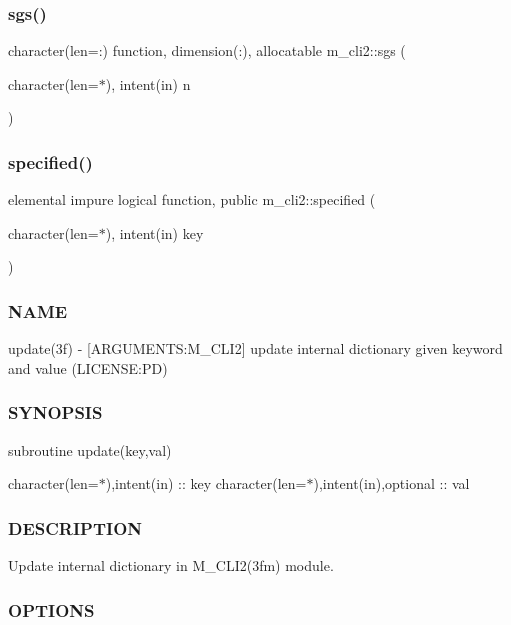 \subsubsection{\texorpdfstring{sgs()}{sgs()}}
{\footnotesize\ttfamily character(len=\+:) function, dimension(\+:), allocatable m\+\_\+cli2\+::sgs (\begin{DoxyParamCaption}\item[{character(len=$\ast$), intent(in)}]{n }\end{DoxyParamCaption})\hspace{0.3cm}{\ttfamily [private]}}

\mbox{\label{namespacem__cli2_a90118f308a5120041a5862fca4740367}} 
\subsubsection{\texorpdfstring{specified()}{specified()}}
{\footnotesize\ttfamily elemental impure logical function, public m\+\_\+cli2\+::specified (\begin{DoxyParamCaption}\item[{character(len=$\ast$), intent(in)}]{key }\end{DoxyParamCaption})}



\subsubsection*{N\+A\+ME}

update(3f) -\/ \mbox{[}A\+R\+G\+U\+M\+E\+N\+TS\+:M\+\_\+\+C\+L\+I2\mbox{]} update internal dictionary given keyword and value (L\+I\+C\+E\+N\+SE\+:PD) \subsubsection*{S\+Y\+N\+O\+P\+S\+IS}

subroutine update(key,val)

character(len=$\ast$),intent(in) \+:\+: key character(len=$\ast$),intent(in),optional \+:\+: val \subsubsection*{D\+E\+S\+C\+R\+I\+P\+T\+I\+ON}

Update internal dictionary in M\+\_\+\+C\+L\+I2(3fm) module. \subsubsection*{O\+P\+T\+I\+O\+NS}

